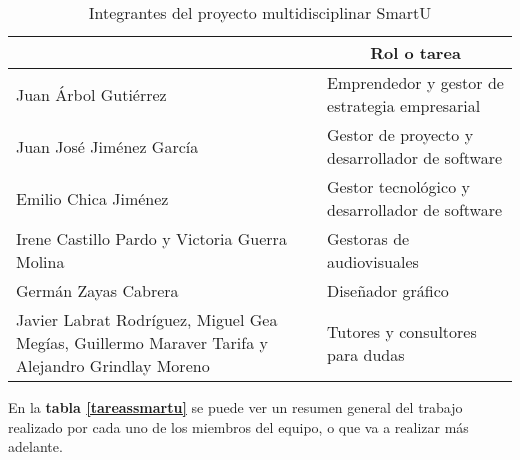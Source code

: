 \begin{table}
    \begin{center}
        \begin{tabular}{|p{5cm}|p{6cm}|}
            \hline
                \rowcolor{Gray}\multicolumn{1}{|c|}{\textbf{Integrante/s}}
                & \multicolumn{1}{|c|}{\textbf{Rol o tarea}} \\
            \hline
                Juan Árbol Gutiérrez & Emprendedor y gestor de estrategia empresarial \\
            \hline
                Juan José Jiménez García & Gestor de proyecto y desarrollador de software \\
            \hline
                Emilio Chica Jiménez & Gestor tecnológico y desarrollador de software \\
            \hline
                Irene Castillo Pardo y Victoria Guerra Molina & Gestoras de audiovisuales \\
            \hline
                Germán Zayas Cabrera & Diseñador gráfico \\
            \hline
                Javier Labrat Rodríguez, Miguel Gea Megías, Guillermo Maraver Tarifa y Alejandro Grindlay Moreno & Tutores y consultores para dudas \\
            \hline
        \end{tabular}

        \caption{Integrantes del proyecto multidisciplinar SmartU}
        \label{rolessmartu}
    \end{center}
\end{table}

En la \textbf{tabla \ref{tareassmartu}} se puede ver un resumen general del trabajo realizado por cada uno de los miembros del equipo, o que va a realizar más adelante.

